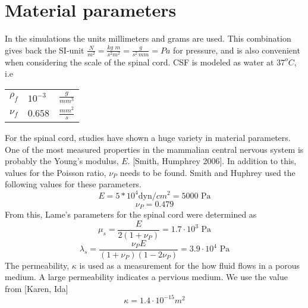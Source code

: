 \chapter{Material parameters}
In the simulations the units millimeters and grams are used. This combination gives back the SI-unit $\frac{N}{m^2} = \frac{kg\,\,m}{s^2 m^2} = \frac{g}{s^2\,mm} = Pa$ for pressure, and is also convenient when considering the scale of the spinal cord. CSF is modeled as water at $37^o C$, i.e \\
\begin{tabular}{ l | l | l} \\
			\text{parameter} & \text{value} & \text{unit} \\ \hline
            $\rho_f$  & $10^{-3}$ & $\frac{g}{mm^3}$ \\ \hline
			$\nu_f$   & $0.658$ & $\frac{mm^2}{s}$ \\ \hline
\end{tabular}

For the spinal cord, studies have shown a huge variety in material parameters. One of the most measured properties in the mammalian central nervous system is probably the Young's modulus, $E$. [Smith, Humphrey 2006]. In addition to this, values for the Poisson ratio, $\nu_P$ needs to be found. Smith and Huphrey used the following values for these parameters. 
\[ E = 5*10^4 \text{dyn}/cm^2  = 5000 \text{ Pa}\]
\[ \nu_P = 0.479 \]
From this, Lame's parameters for the spinal cord were determined as
\[ \mu_s = \frac{E}{2(1 + \nu_P)} = 1.7 \cdot 10^3 \text{ Pa}\]
\[ \lambda_s = \frac{\nu_P E}{(1 + \nu_P)(1-2\nu_P)} = 3.9 \cdot 10^4 \text{ Pa}\]
The permeability, $\kappa$ is used as a measurement for the how fluid flows in a porous medium. A large permeability indicates a pervious medium. We use the value from [Karen, Ida]
\[ \kappa = 1.4\cdot 10^{-15} m^2 \]
